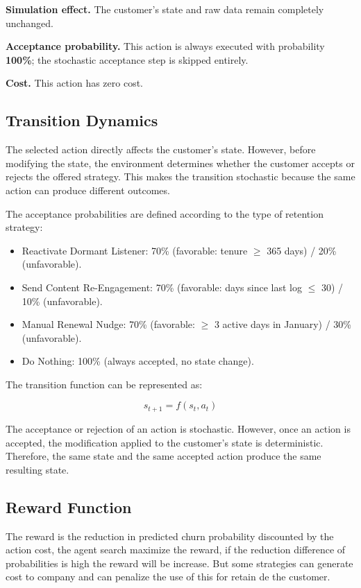 \documentclass{article}
\begin{document}
\textbf{Simulation effect.}
The customer's state and raw data remain completely unchanged.

\textbf{Acceptance probability.}
This action is always executed with probability \textbf{100\%}; the stochastic acceptance
step is skipped entirely.

\textbf{Cost.}
This action has zero cost.

\subsection{Transition Dynamics}

The selected action directly affects the customer's state. However, before modifying the state,
the environment determines whether the customer accepts or rejects the offered strategy. This
makes the transition stochastic because the same action can produce different outcomes.

The acceptance probabilities are defined according to the type of retention strategy:

\begin{itemize}
\item Reactivate Dormant Listener: 70\% (favorable: tenure $\geq$ 365 days) / 20\% (unfavorable).
\item Send Content Re-Engagement: 70\% (favorable: days since last log $\leq$ 30) / 10\% (unfavorable).
\item Manual Renewal Nudge: 70\% (favorable: $\geq$ 3 active days in January) / 30\% (unfavorable).
\item Do Nothing: 100\% (always accepted, no state change).
\end{itemize}

The transition function can be represented as:

\begin{equation}
s_{t+1} = f(s_t, a_t)
\end{equation}

The acceptance or rejection of an action is stochastic. However, once an action is accepted,
the modification applied to the customer's state is deterministic. Therefore, the same state
and the same accepted action produce the same resulting state.

\subsection{Reward Function}

The reward is the reduction in predicted churn probability discounted by the action cost, 
the agent search maximize the reward, if the reduction difference of probabilities is high the reward will be increase.
But some strategies can generate cost to company and can penalize the use of this for retain de the customer.  
\end{document}
